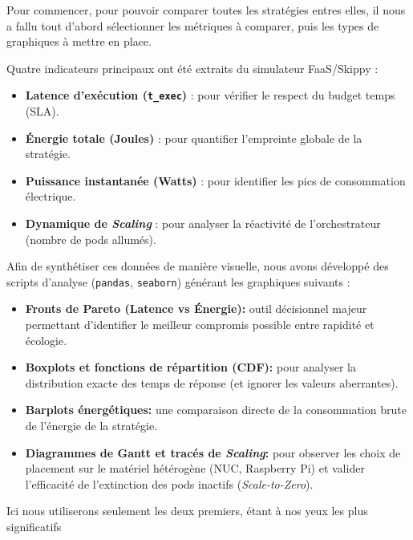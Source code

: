 Pour commencer, pour pouvoir comparer toutes les stratégies entres elles, il nous a fallu tout d'abord sélectionner les métriques à comparer, puis les types de graphiques à mettre en place.

Quatre indicateurs principaux ont été extraits du simulateur FaaS/Skippy :
\begin{itemize}
    \item \textbf{Latence d'exécution (\texttt{t\_exec})} : pour vérifier le respect du budget temps (SLA).
    \item \textbf{Énergie totale (Joules)} : pour quantifier l'empreinte globale de la stratégie.
    \item \textbf{Puissance instantanée (Watts)} : pour identifier les pics de consommation électrique.
    \item \textbf{Dynamique de \textit{Scaling}} : pour analyser la réactivité de l'orchestrateur (nombre de pods allumés).
\end{itemize}

Afin de synthétiser ces données de manière visuelle, nous avons développé des scripts d'analyse (\texttt{pandas}, \texttt{seaborn}) générant les graphiques suivants :
\begin{itemize}
    \item \textbf{Fronts de Pareto (Latence vs Énergie):} outil décisionnel majeur permettant d'identifier le meilleur compromis possible entre rapidité et écologie.
    \item \textbf{Boxplots et fonctions de répartition (CDF):} pour analyser la distribution exacte des temps de réponse (et ignorer les valeurs aberrantes).
    \item \textbf{Barplots énergétiques:} une comparaison directe de la consommation brute de l'énergie de la stratégie.
    \item \textbf{Diagrammes de Gantt et tracés de \textit{Scaling}:} pour observer les choix de placement sur le matériel hétérogène (NUC, Raspberry Pi) et valider l'efficacité de l'extinction des pods inactifs (\textit{Scale-to-Zero}).
\end{itemize}
Ici nous utiliserons seulement les deux premiers, étant à nos yeux les plus significatifs